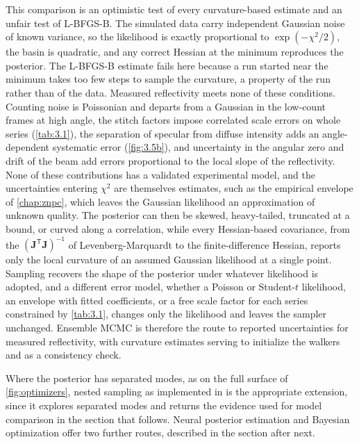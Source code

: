 This comparison is an optimistic test of every curvature-based estimate and an unfair test of L-BFGS-B. The simulated data carry independent Gaussian noise of known variance, so the likelihood is exactly proportional to \(\exp\left( - \chi^{2}/2 \right)\), the basin is quadratic, and any correct Hessian at the minimum reproduces the posterior. The L-BFGS-B estimate fails here because a run started near the minimum takes too few steps to sample the curvature, a property of the run rather than of the data. Measured reflectivity meets none of these conditions. Counting noise is Poissonian and departs from a Gaussian in the low-count frames at high angle, the stitch factors impose correlated scale errors on whole series (\cref{tab:3.1}), the separation of specular from diffuse intensity adds an angle-dependent systematic error (\cref{fig:3.5b}), and uncertainty in the angular zero and drift of the beam add errors proportional to the local slope of the reflectivity. None of these contributions has a validated experimental model, and the uncertainties entering \(\chi^{2}\) are themselves estimates, such as the empirical envelope of \cref{chap:znpc}, which leaves the Gaussian likelihood an approximation of unknown quality. The posterior can then be skewed, heavy-tailed, truncated at a bound, or curved along a correlation, while every Hessian-based covariance, from the \(\left( \mathbf{J}^{\mathsf{T}}\mathbf{J} \right)^{- 1}\) of Levenberg-Marquardt to the finite-difference Hessian, reports only the local curvature of an assumed Gaussian likelihood at a single point. Sampling recovers the shape of the posterior under whatever likelihood is adopted, and a different error model, whether a Poisson or Student-\(t\) likelihood, an envelope with fitted coefficients, or a free scale factor for each series constrained by \cref{tab:3.1}, changes only the likelihood and leaves the sampler unchanged. Ensemble MCMC is therefore the route to reported uncertainties for measured reflectivity, with curvature estimates serving to initialize the walkers and as a consistency check.

Where the posterior has separated modes, as on the full surface of \cref{fig:optimizers}, nested sampling as implemented in \autocite{speagleDynestyDynamicNested2020} is the appropriate extension, since it explores separated modes and returns the evidence used for model comparison in the section that follows. Neural posterior estimation and Bayesian optimization offer two further routes, described in the section after next.\autocite{starostinFastReliableProbabilistic2025,machidaDevelopmentBayesianInference2024}

